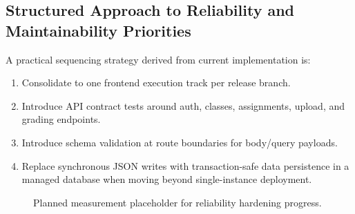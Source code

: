 \subsection{Structured Approach to Reliability and Maintainability Priorities}

A practical sequencing strategy derived from current implementation is:
\begin{enumerate}[leftmargin=1.5em]
  \item Consolidate to one frontend execution track per release branch.
  \item Introduce API contract tests around auth, classes, assignments, upload, and grading endpoints.
  \item Introduce schema validation at route boundaries for body/query payloads.
  \item Replace synchronous JSON writes with transaction-safe data persistence in a managed database when moving beyond single-instance deployment.
\end{enumerate}

\begin{figure}[h]
\centering
{}
\caption{Planned measurement placeholder for reliability hardening progress.}
\label{fig:reliability-placeholder}
\end{figure}
